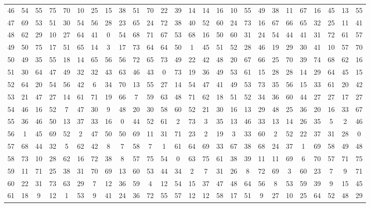 \begin{table}
\begin{tabular}{c c c c c c c c c c c c c c c c c c c c c c c c c c }
46 & 54 & 55 & 75 & 70 & 10 & 25 & 15 & 38 & 51 & 70 & 22 & 39 & 14 & 14 & 16 & 10 & 55 & 49 & 38 & 11 & 67 & 16 & 45 & 13 & 55 \\
47 & 69 & 53 & 51 & 30 & 54 & 56 & 28 & 23 & 65 & 24 & 72 & 38 & 40 & 52 & 60 & 24 & 73 & 16 & 67 & 66 & 65 & 32 & 25 & 11 & 41 \\
48 & 62 & 29 & 10 & 27 & 64 & 41 & 0 & 54 & 68 & 71 & 67 & 53 & 68 & 16 & 50 & 60 & 31 & 24 & 54 & 44 & 41 & 31 & 72 & 61 & 57 \\
49 & 50 & 75 & 17 & 51 & 65 & 14 & 3 & 17 & 73 & 64 & 64 & 50 & 1 & 45 & 51 & 52 & 28 & 46 & 19 & 29 & 30 & 41 & 10 & 57 & 70 \\
50 & 49 & 35 & 55 & 18 & 14 & 65 & 56 & 56 & 72 & 65 & 73 & 49 & 22 & 42 & 48 & 20 & 67 & 66 & 25 & 70 & 39 & 74 & 68 & 62 & 16 \\
51 & 30 & 64 & 47 & 49 & 32 & 32 & 43 & 63 & 46 & 43 & 0 & 73 & 19 & 36 & 49 & 53 & 61 & 15 & 28 & 28 & 14 & 29 & 64 & 45 & 15 \\
52 & 64 & 20 & 54 & 56 & 42 & 6 & 34 & 70 & 13 & 55 & 27 & 14 & 54 & 47 & 41 & 49 & 53 & 73 & 35 & 56 & 15 & 33 & 61 & 20 & 42 \\
53 & 21 & 47 & 27 & 14 & 61 & 71 & 19 & 66 & 7 & 59 & 63 & 48 & 71 & 62 & 18 & 51 & 52 & 34 & 36 & 60 & 44 & 27 & 27 & 17 & 27 \\
54 & 46 & 16 & 52 & 7 & 47 & 30 & 9 & 48 & 20 & 30 & 58 & 60 & 52 & 21 & 30 & 16 & 13 & 29 & 48 & 25 & 36 & 20 & 16 & 33 & 67 \\
55 & 36 & 46 & 50 & 13 & 37 & 33 & 16 & 0 & 44 & 52 & 61 & 2 & 73 & 3 & 35 & 13 & 46 & 33 & 13 & 14 & 26 & 35 & 5 & 2 & 46 \\
56 & 1 & 45 & 69 & 52 & 2 & 47 & 50 & 50 & 69 & 11 & 31 & 71 & 23 & 2 & 19 & 3 & 33 & 60 & 2 & 52 & 22 & 37 & 31 & 28 & 0 \\
57 & 68 & 44 & 32 & 5 & 62 & 42 & 8 & 7 & 58 & 7 & 1 & 61 & 64 & 69 & 33 & 67 & 38 & 68 & 24 & 37 & 1 & 69 & 58 & 49 & 48 \\
58 & 73 & 10 & 28 & 62 & 16 & 72 & 38 & 8 & 57 & 75 & 54 & 0 & 63 & 75 & 61 & 38 & 39 & 11 & 11 & 69 & 6 & 70 & 57 & 71 & 75 \\
59 & 11 & 71 & 25 & 38 & 31 & 70 & 69 & 13 & 60 & 53 & 44 & 34 & 2 & 7 & 31 & 26 & 8 & 72 & 69 & 3 & 60 & 23 & 7 & 9 & 71 \\
60 & 22 & 31 & 73 & 63 & 29 & 7 & 12 & 36 & 59 & 4 & 12 & 54 & 15 & 37 & 47 & 48 & 64 & 56 & 8 & 53 & 59 & 39 & 9 & 15 & 45 \\
61 & 18 & 9 & 12 & 1 & 53 & 9 & 41 & 24 & 36 & 72 & 55 & 57 & 12 & 12 & 58 & 17 & 51 & 9 & 27 & 10 & 25 & 64 & 52 & 48 & 29 \\

\end{tabular}
\end{table}
